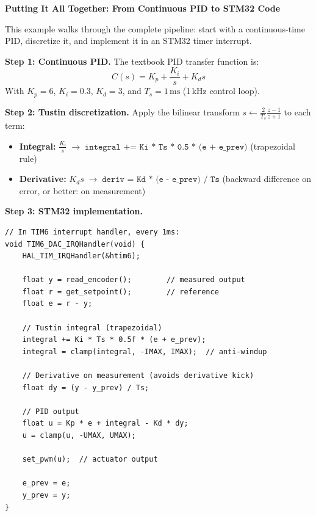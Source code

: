 \begin{mdframed}[linewidth=1pt, innertopmargin=10pt, innerbottommargin=10pt]
\textbf{Putting It All Together: From Continuous PID to STM32 Code}

\vspace{0.3em}
This example walks through the complete pipeline: start with a continuous-time PID, discretize it, and implement it in an STM32 timer interrupt.

\textbf{Step 1: Continuous PID.} The textbook PID transfer function is:
\[
C(s) = K_p + \frac{K_i}{s} + K_d s
\]
With $K_p = 6$, $K_i = 0.3$, $K_d = 3$, and $T_s = 1\,\text{ms}$ (1\,kHz control loop).

\textbf{Step 2: Tustin discretization.} Apply the bilinear transform $s \leftarrow \frac{2}{T_s}\frac{z-1}{z+1}$ to each term:
\begin{itemize}[nosep]
    \item \textbf{Integral:} $\frac{K_i}{s} \;\to\; \texttt{integral += Ki * Ts * 0.5 * (e + e\_prev)}$ (trapezoidal rule)
    \item \textbf{Derivative:} $K_d s \;\to\; \texttt{deriv = Kd * (e - e\_prev) / Ts}$ (backward difference on error, or better: on measurement)
\end{itemize}

\textbf{Step 3: STM32 implementation.}
\begin{verbatim}
// In TIM6 interrupt handler, every 1ms:
void TIM6_DAC_IRQHandler(void) {
    HAL_TIM_IRQHandler(&htim6);

    float y = read_encoder();        // measured output
    float r = get_setpoint();        // reference
    float e = r - y;

    // Tustin integral (trapezoidal)
    integral += Ki * Ts * 0.5f * (e + e_prev);
    integral = clamp(integral, -IMAX, IMAX);  // anti-windup

    // Derivative on measurement (avoids derivative kick)
    float dy = (y - y_prev) / Ts;

    // PID output
    float u = Kp * e + integral - Kd * dy;
    u = clamp(u, -UMAX, UMAX);

    set_pwm(u);  // actuator output

    e_prev = e;
    y_prev = y;
}
\end{verbatim}


\end{mdframed}
